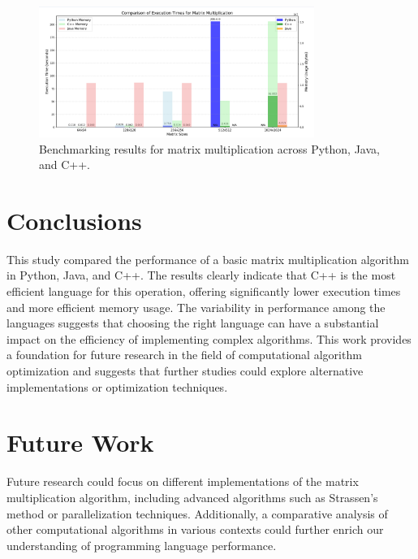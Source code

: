 \documentclass{article}
\begin{document}
\begin{figure}[h]
    \centering
    \includegraphics[width=0.8\textwidth]{comparison.png} %
    \caption{Benchmarking results for matrix multiplication across Python, Java, and C++.}
    \label{fig:benchmark_results}
\end{figure}

\section{Conclusions}
This study compared the performance of a basic matrix multiplication algorithm in Python, Java, and C++. The results clearly indicate that C++ is the most efficient language for this operation, offering significantly lower execution times and more efficient memory usage. The variability in performance among the languages suggests that choosing the right language can have a substantial impact on the efficiency of implementing complex algorithms. This work provides a foundation for future research in the field of computational algorithm optimization and suggests that further studies could explore alternative implementations or optimization techniques.

\section{Future Work}
Future research could focus on different implementations of the matrix multiplication algorithm, including advanced algorithms such as Strassen's method or parallelization techniques. Additionally, a comparative analysis of other computational algorithms in various contexts could further enrich our understanding of programming language performance.
\end{document}
